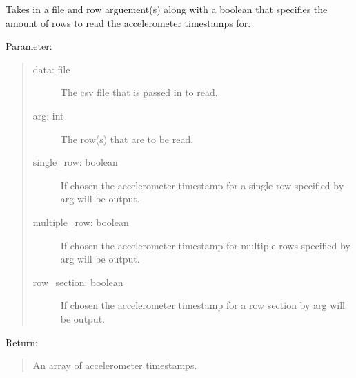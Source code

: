 \documentclass[letterpaper,10pt,english]{sphinxmanual}
\begin{document}
\begin{fulllineitems}
\label{\detokenize{Lidar extraction tool:imu_extract.get_accel_time}}
Takes in a file and row arguement(s) along with a boolean that specifies the amount of rows to read the accelerometer timestamps for.

Parameter:
\begin{quote}
\begin{description}
\item[{data: file}] \leavevmode
The csv file that is passed in to read.

\item[{arg: int}] \leavevmode
The row(s) that are to be read.

\item[{single\_row: boolean}] \leavevmode
If chosen the accelerometer timestamp for a single row specified by arg will be output.

\item[{multiple\_row: boolean}] \leavevmode
If chosen the accelerometer timestamp for multiple rows specified by arg will be output.

\item[{row\_section: boolean}] \leavevmode
If chosen the accelerometer timestamp for a row section by arg will be output.

\end{description}
\end{quote}

Return:
\begin{quote}

An array of accelerometer timestamps.
\end{quote}

\end{fulllineitems}

\end{document}
